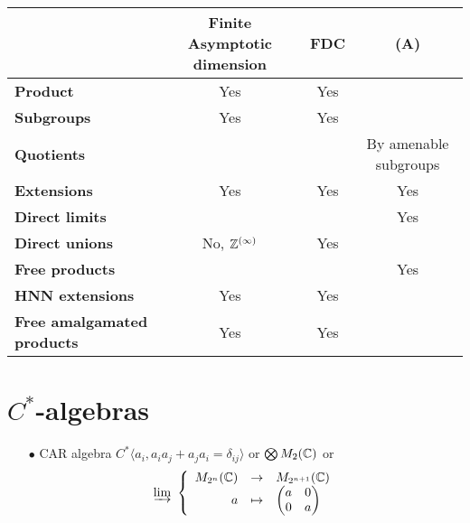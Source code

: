 \begin{table}[h]
\begin{tabular}{c|c|c|c|}
\cline{2-4}
                                                         & \textbf{Finite Asymptotic dimension} & \textbf{FDC} & \textbf{(A)}    \\ \hline
\multicolumn{1}{|l|}{\textbf{Product}}                   &              Yes     &            Yes    &                            \\ \hline
\multicolumn{1}{|l|}{\textbf{Subgroups}}                 &              Yes     &           Yes     &                             \\ \hline
\multicolumn{1}{|l|}{\textbf{Quotients}}                 &                      &                   &     By amenable subgroups   \\ \hline
\multicolumn{1}{|l|}{\textbf{Extensions}}                &            Yes       &            Yes    &     Yes                     \\ \hline
\multicolumn{1}{|l|}{\textbf{Direct limits}}             &                      &                   &     Yes                     \\ \hline
\multicolumn{1}{|l|}{\textbf{Direct unions}}             & No, $\mathbb Z ^{(\infty)}$ &            Yes    &                             \\ \hline
\multicolumn{1}{|l|}{\textbf{Free products}}             &                      &                   &     Yes                     \\ \hline
\multicolumn{1}{|l|}{\textbf{HNN extensions}}            &          Yes         &             Yes   &                             \\ \hline
\multicolumn{1}{|l|}{\textbf{Free amalgamated products}} &           Yes        &              Yes  &                             \\ \hline
\end{tabular}
\end{table}

\section{$C^*$-algebras}

\begin{itemize}
\item[$\bullet$] CAR algebra $C^*\langle a_i , a_i a_j +a_j a_i = \delta_{ij} \rangle $ or $\bigotimes M_2(\mathbb C)$ or 
\[\varinjlim \ 
\left\{\begin{array}{rcl} 
M_{2^n}(\C) & \rightarrow & M_{2^{n+1}}(\C) \\ 
a           & \mapsto     & \begin{pmatrix} a & 0 \\ 0 & a\end{pmatrix}\end{array}\right.\]
\end{itemize}

